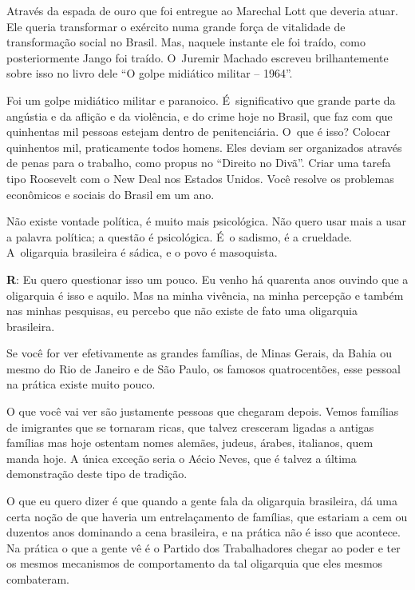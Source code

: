  

Através da espada de ouro que foi entregue ao Marechal Lott que deveria
atuar. Ele queria transformar o exército numa grande força de vitalidade
de transformação social no Brasil. Mas, naquele instante ele foi traído,
como posteriormente Jango foi traído. O~Juremir Machado escreveu
brilhantemente sobre isso no livro dele ``O golpe midiático militar --
1964''.

 

Foi um golpe midiático militar e paranoico. É~significativo que grande
parte da angústia e da aflição e da violência, e do crime hoje no
Brasil, que faz com que quinhentas mil pessoas estejam dentro de
penitenciária. O~que é isso? Colocar quinhentos mil, praticamente todos
homens. Eles deviam ser organizados através de penas para o trabalho,
como propus no ``Direito no Divã''. Criar uma tarefa tipo Roosevelt com
o New Deal nos Estados Unidos. Você resolve os problemas econômicos e
sociais do Brasil em um ano.

 

Não existe vontade política, é muito mais psicológica. Não quero usar
mais a usar a palavra política; a questão é psicológica. É~o sadismo, é
a crueldade. A~oligarquia brasileira é sádica, e o povo é masoquista.

 

\textbf{R}: Eu quero questionar isso um pouco. Eu venho há quarenta anos
ouvindo que a oligarquia é isso e aquilo. Mas na minha vivência, na
minha percepção e também nas minhas pesquisas, eu percebo que não existe
de fato uma oligarquia brasileira.

 

Se você for ver efetivamente as grandes famílias, de Minas Gerais, da
Bahia ou mesmo do Rio de Janeiro e de São Paulo, os famosos
quatrocentões, esse pessoal na prática existe muito pouco.

 

O que você vai ver são justamente pessoas que chegaram depois. Vemos
famílias de imigrantes que se tornaram ricas, que talvez cresceram
ligadas a antigas famílias mas hoje ostentam nomes alemães, judeus,
árabes, italianos, quem manda hoje. A única exceção seria o Aécio Neves,
que é talvez a última demonstração deste tipo de tradição.

 

O que eu quero dizer é que quando a gente fala da oligarquia
brasileira, dá uma certa noção de que haveria um entrelaçamento de
famílias, que estariam a cem ou duzentos anos dominando a cena
brasileira, e na prática não é isso que acontece. Na prática o que a
gente vê é o Partido dos Trabalhadores chegar ao poder e ter os mesmos
mecanismos de comportamento da tal oligarquia que eles mesmos
combateram.

